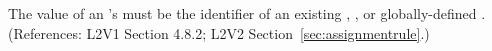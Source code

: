 The value of an \AssignmentRule's  must be the identifier
of an existing \Compartment, \Species, or globally-defined \Parameter.
(References: L2V1 Section 4.8.2; L2V2 Section~\ref{sec:assignmentrule}.)
